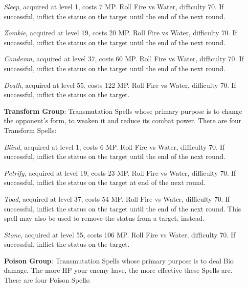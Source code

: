 \begin{multicols}{2}
    \textit{Sleep}, acquired at level 1, costs 7 MP\@. Roll Fire vs Water, difficulty 70. If successful, inflict the  status on the target until the end of the next round.
    
    \textit{Zombie}, acquired at level 19, costs 20 MP\@. Roll Fire vs Water, difficulty 70. If successful, inflict the  status on the target until the end of the next round.
    
    \textit{Condemn}, acquired at level 37, costs 60 MP\@. Roll Fire vs Water, difficulty 70. If successful, inflict the  status on the target until the end of the next round.
    
    \textit{Death}, acquired at level 55, costs 122 MP\@. Roll Fire vs Water, difficulty 70. If successful, inflict the  status on the target\@.

    \ffcrystal[type=level,height=8pt]

    \textbf{Transform Group}: Transmutation Spells whose primary purpose is to change the opponent’s form, to weaken it and reduce its combat power. There are four Transform Spells:
    
    \textit{Blind}, acquired at level 1, costs 6 MP\@. Roll Fire vs Water, difficulty 70. If successful, inflict the  status on the target until the end of the next round.
    
    \textit{Petrify}, acquired at level 19, costs 23 MP\@. Roll Fire vs Water, difficulty 70. If successful, inflict the  status on the target at end of the next round.
    
    \textit{Toad}, acquired at level 37, costs 54 MP\@. Roll Fire vs Water, difficulty 70. If successful, inflict the  status on the target until the end of the next round. This spell may also be used to remove the  status from a target, instead.
    
    \textit{Stone}, acquired at level 55, costs 106 MP\@. Roll Fire vs Water, difficulty 70. If successful, inflict the  status on the target.

    \ffcrystal[type=level,height=8pt]

    \textbf{Poison Group}: Transmutation Spells whose primary purpose is to deal Bio damage. The more HP your enemy have, the more effective these Spells are. There are four Poison Spells:
    

\end{multicols}
